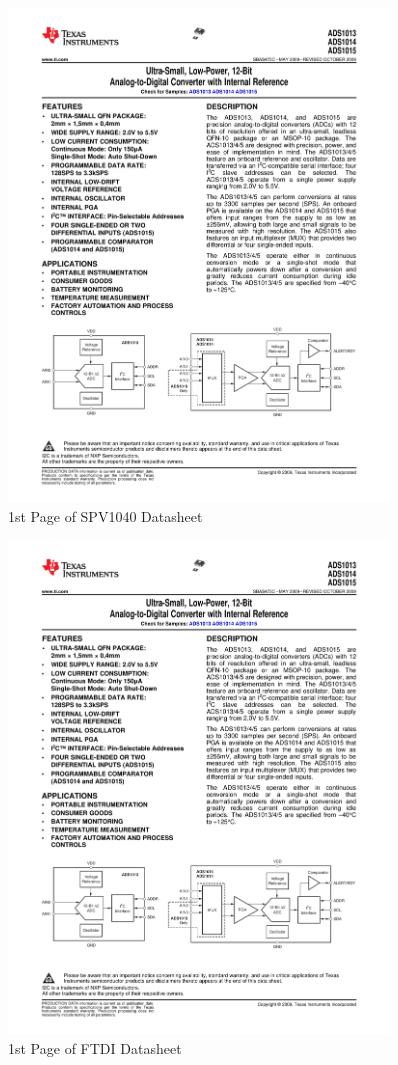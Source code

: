\documentclass{article}
\numberwithin{figure}{section}
\numberwithin{equation}{section}
\begin{document}
{\begin{figure}[H]
	\centering
	\includegraphics[page=12,width=0.9\textwidth]{combined.pdf}
	\caption{1st Page of SPV1040 Datasheet}
	\label{fig:spvdat}
\end{figure}

\begin{figure}[H]
	\centering
	\includegraphics[page=13,width=0.9\textwidth]{combined.pdf}
	\caption{1st Page of FTDI Datasheet}
	\label{fig:ftdidat}
\end{figure}
\newpage
}
\end{document}
